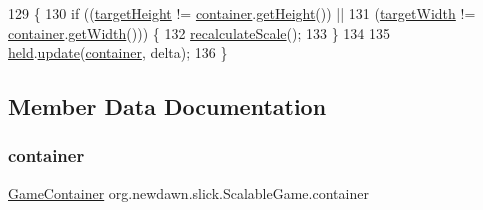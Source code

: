 \begin{DoxyCode}
129                                                                                  \{
130         \textcolor{keywordflow}{if} ((\mbox{\hyperlink{classorg_1_1newdawn_1_1slick_1_1_scalable_game_a99f38c5f6f77f872c998a0278a394a50}{targetHeight}} != \mbox{\hyperlink{classorg_1_1newdawn_1_1slick_1_1_scalable_game_ae8df04372ae01e645445bc4a22f58c7c}{container}}.\mbox{\hyperlink{classorg_1_1newdawn_1_1slick_1_1_game_container_a7eff88473fe5715fdfc2f92e8cb48521}{getHeight}}()) ||
131             (\mbox{\hyperlink{classorg_1_1newdawn_1_1slick_1_1_scalable_game_a77bf0db185d31f78befc3b9ff9c69a9e}{targetWidth}} != \mbox{\hyperlink{classorg_1_1newdawn_1_1slick_1_1_scalable_game_ae8df04372ae01e645445bc4a22f58c7c}{container}}.\mbox{\hyperlink{classorg_1_1newdawn_1_1slick_1_1_game_container_a938fe1a28567182445e60450915d5f69}{getWidth}}())) \{
132             \mbox{\hyperlink{classorg_1_1newdawn_1_1slick_1_1_scalable_game_abb55f95f659cbab0f9ac35b73ff16187}{recalculateScale}}();
133         \}
134         
135         \mbox{\hyperlink{classorg_1_1newdawn_1_1slick_1_1_scalable_game_a9f1fb24a0827c8d6619e682e6239a475}{held}}.\mbox{\hyperlink{interfaceorg_1_1newdawn_1_1slick_1_1_game_ab07b2e9463ee4631620dde0de25bdee8}{update}}(\mbox{\hyperlink{classorg_1_1newdawn_1_1slick_1_1_scalable_game_ae8df04372ae01e645445bc4a22f58c7c}{container}}, delta);
136     \}
\end{DoxyCode}


\subsection{Member Data Documentation}
\mbox{\label{classorg_1_1newdawn_1_1slick_1_1_scalable_game_ae8df04372ae01e645445bc4a22f58c7c}} 
\subsubsection{\texorpdfstring{container}{container}}
{\footnotesize\ttfamily \mbox{\hyperlink{classorg_1_1newdawn_1_1slick_1_1_game_container}{Game\+Container}} org.\+newdawn.\+slick.\+Scalable\+Game.\+container\hspace{0.3cm}{\ttfamily [private]}}

